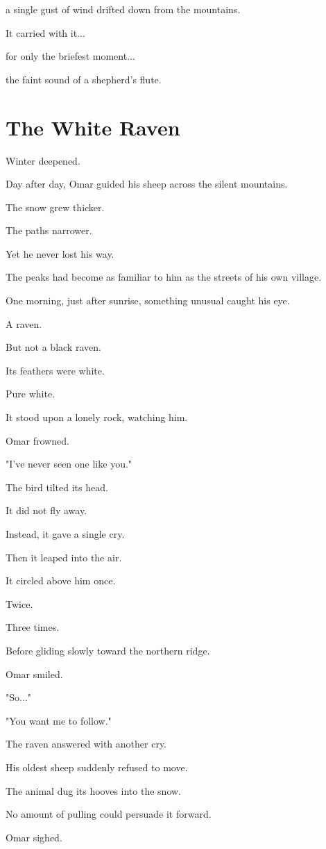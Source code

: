 \documentclass[12pt,openany]{book}
\begin{document}
a single gust of wind drifted down from the mountains.

It carried with it...

for only the briefest moment...

the faint sound of a shepherd's flute.
\section*{The White Raven}

Winter deepened.

Day after day, Omar guided his sheep across the silent mountains.

The snow grew thicker.

The paths narrower.

Yet he never lost his way.

The peaks had become as familiar to him as the streets of his own village.

One morning, just after sunrise, something unusual caught his eye.

A raven.

But not a black raven.

Its feathers were white.

Pure white.

It stood upon a lonely rock, watching him.

Omar frowned.

"I've never seen one like you."

The bird tilted its head.

It did not fly away.

Instead, it gave a single cry.

Then it leaped into the air.

It circled above him once.

Twice.

Three times.

Before gliding slowly toward the northern ridge.

Omar smiled.

"So..."

"You want me to follow."

The raven answered with another cry.

His oldest sheep suddenly refused to move.

The animal dug its hooves into the snow.

No amount of pulling could persuade it forward.

Omar sighed.
\end{document}
